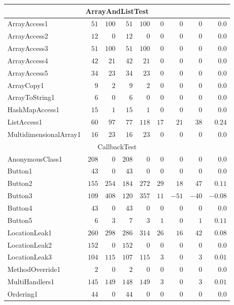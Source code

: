 \documentclass[../draft.tex]{subfiles}
\newcommand{\tsubEight}[1]{\multicolumn{9}{c}{#1}\\\hline}
\begin{document}
\begin{longtable}{l | r | r | r | r | r | r | r | r}
        \hline
        \tsubEight{ArrayAndListTest}
        ArrayAccess1 & $51$ & $100$ & $51$ & $100$ & $0$ & $0$ & $0$ & $0.0$\\
        ArrayAccess2 & $12$ & $0$ & $12$ & $0$ & $0$ & $0$ & $0$ & $0.0$\\
        ArrayAccess3 & $51$ & $100$ & $51$ & $100$ & $0$ & $0$ & $0$ & $0.0$\\
        ArrayAccess4 & $42$ & $21$ & $42$ & $21$ & $0$ & $0$ & $0$ & $0.0$\\
        ArrayAccess5 & $34$ & $23$ & $34$ & $23$ & $0$ & $0$ & $0$ & $0.0$\\
        ArrayCopy1 & $9$ & $2$ & $9$ & $2$ & $0$ & $0$ & $0$ & $0.0$\\
        ArrayToString1 & $6$ & $0$ & $6$ & $0$ & $0$ & $0$ & $0$ & $0.0$\\
        HashMapAccess1 & $15$ & $1$ & $15$ & $1$ & $0$ & $0$ & $0$ & $0.0$\\
        ListAccess1 & $60$ & $97$ & $77$ & $118$ & $17$ & $21$ & $38$ & $0.24$\\
        MultidimensionalArray1 & $16$ & $23$ & $16$ & $23$ & $0$ & $0$ & $0$ & $0.0$\\
        \hline
        \tsubEight{CallbackTest}
        AnonymousClass1 & $208$ & $0$ & $208$ & $0$ & $0$ & $0$ & $0$ & $0.0$\\
        Button1 & $43$ & $0$ & $43$ & $0$ & $0$ & $0$ & $0$ & $0.0$\\
        Button2 & $155$ & $254$ & $184$ & $272$ & $29$ & $18$ & $47$ & $0.11$\\
        Button3 & $109$ & $408$ & $120$ & $357$ & $11$ & $-51$ & $-40$ & $-0.08$\\
        Button4 & $43$ & $0$ & $43$ & $0$ & $0$ & $0$ & $0$ & $0.0$\\
        Button5 & $6$ & $3$ & $7$ & $3$ & $1$ & $0$ & $1$ & $0.11$\\
        LocationLeak1 & $260$ & $298$ & $286$ & $314$ & $26$ & $16$ & $42$ & $0.08$\\
        LocationLeak2 & $152$ & $0$ & $152$ & $0$ & $0$ & $0$ & $0$ & $0.0$\\
        LocationLeak3 & $104$ & $115$ & $107$ & $115$ & $3$ & $0$ & $3$ & $0.01$\\
        MethodOverride1 & $2$ & $0$ & $2$ & $0$ & $0$ & $0$ & $0$ & $0.0$\\
        MultiHandlers1 & $145$ & $149$ & $148$ & $149$ & $3$ & $0$ & $3$ & $0.01$\\
        Ordering1 & $44$ & $0$ & $44$ & $0$ & $0$ & $0$ & $0$ & $0.0$\\

\end{longtable}
\end{document}
